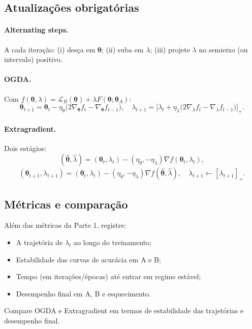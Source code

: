 \documentclass[9pt,a4paper]{extarticle}
\begin{document}
\subsection*{Atualizações obrigatórias}
\paragraph{Alternating steps.}
A cada iteração: (i) desça em $\bm{\theta}$; (ii) suba em $\lambda$; (iii) projete $\lambda$ no semieixo (ou intervalo) positivo.

\paragraph{OGDA.}
Com $f(\bm{\theta},\lambda)=\mathcal{L}_B(\bm{\theta})+\lambda F(\bm{\theta};\bm{\theta}_A)$:
\[
\bm{\theta}_{t+1} = \bm{\theta}_{t} - \eta_\theta\big(2\nabla_{\bm{\theta}} f_t - \nabla_{\bm{\theta}} f_{t-1}\big),\quad
\lambda_{t+1} = \big[\lambda_{t} + \eta_\lambda\big(2\nabla_{\lambda} f_t - \nabla_{\lambda} f_{t-1}\big)\big]_+.
\]

\paragraph{Extragradient.}
Dois estágios:
\[
(\hat{\bm{\theta}},\hat{\lambda}) = (\bm{\theta}_{t},\lambda_t) - (\eta_\theta,-\eta_\lambda)\nabla f(\bm{\theta}_t,\lambda_t),
\]
\[
(\bm{\theta}_{t+1},\lambda_{t+1}) = (\bm{\theta}_{t},\lambda_t) - (\eta_\theta,-\eta_\lambda)\nabla f(\hat{\bm{\theta}},\hat{\lambda}),\quad
\lambda_{t+1}\leftarrow[\lambda_{t+1}]_+.
\]

\subsection*{Métricas e comparação}
Além das métricas da Parte 1, registre:
\begin{itemize}
    \item A trajetória de $\lambda_t$ ao longo do treinamento;
    \item Estabilidade das curvas de acurácia em A e B;
    \item Tempo (em iterações/épocas) até entrar em regime estável;
    \item Desempenho final em A, B e esquecimento.
\end{itemize}
Compare OGDA e Extragradient em termos de estabilidade das trajetórias e desempenho final.

\end{document}
